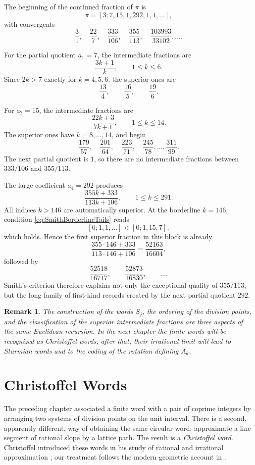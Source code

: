 \documentclass{book}
\newtheorem{remark}[definition]{Remark}
\begin{document}
The beginning of the continued fraction of \(\pi\) is
\[
  \pi=[3;7,15,1,292,1,1,\ldots],
\]
with convergents
\[
  \frac31,\quad
  \frac{22}{7},\quad
  \frac{333}{106},\quad
  \frac{355}{113},\quad
  \frac{103993}{33102},\ldots.
\]

For the partial quotient \(a_1=7\), the intermediate fractions are
\[
  \frac{3k+1}{k},
  \qquad 1\leq k\leq6.
\]
Since \(2k>7\) exactly for \(k=4,5,6\), the superior ones are
\[
  \frac{13}{4},\qquad
  \frac{16}{5},\qquad
  \frac{19}{6}.
\]

For \(a_2=15\), the intermediate fractions are
\[
  \frac{22k+3}{7k+1},
  \qquad 1\leq k\leq14.
\]
The superior ones have \(k=8,\ldots,14\), and begin
\[
  \frac{179}{57},\quad
  \frac{201}{64},\quad
  \frac{223}{71},\quad
  \frac{245}{78},\ldots,\frac{311}{99}.
\]
The next partial quotient is \(1\), so there are no intermediate fractions
between \(333/106\) and \(355/113\).

The large coefficient \(a_4=292\) produces
\[
  \frac{355k+333}{113k+106},
  \qquad 1\leq k\leq291.
\]
All indices \(k>146\) are automatically superior. At the borderline
\(k=146\), condition \eqref{eq:SmithBorderlineTails} reads
\[
  [0;1,1,\ldots]<[0;1,15,7],
\]
which holds. Hence the first superior fraction in this block is already
\[
  \frac{355\cdot146+333}{113\cdot146+106}
  =\frac{52163}{16604},
\]
followed by
\[
  \frac{52518}{16717},\qquad
  \frac{52873}{16830},\qquad\ldots.
\]
Smith's criterion therefore explains not only the exceptional quality of
\(355/113\), but the long family of first-kind records created by the next
partial quotient \(292\).

\begin{remark}
  The construction of the words \(S_j\), the ordering of the division
  points, and the classification of the superior intermediate fractions are
  three aspects of the same Euclidean recursion. In the next chapter the
  finite words will be recognized as Christoffel words; after that, their
  irrational limit will lead to Sturmian words and to the coding of the
  rotation defining \(A_\theta\).
\end{remark} 


\chapter{Christoffel Words} 

The preceding chapter associated a finite word with a pair of coprime
integers by arranging two systems of division points on the unit interval.
There is a second, apparently different, way of obtaining the same circular
word: approximate a line segment of rational slope by a lattice path.  The
result is a \emph{Christoffel word}.  Christoffel introduced these words in
his study of rational and irrational approximation
\cite{Christoffel1875}; our treatment follows the modern geometric account
in \cite[Part~I, Chapters~1, 3 and~7]{BerstelLauveReutenauerSaliola2009}.
\end{document}
